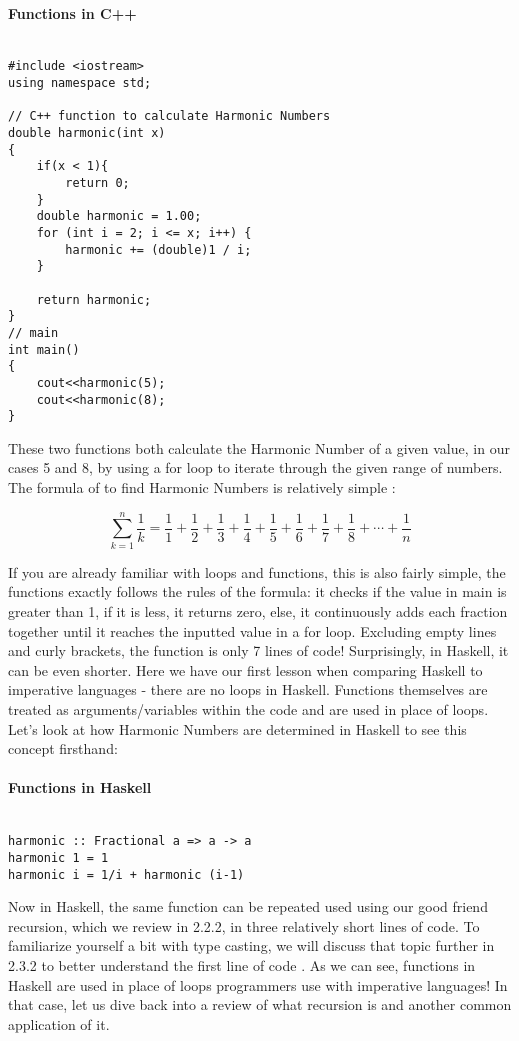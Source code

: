 \documentclass{article}
\begin{document}
\paragraph{Functions in C++}
\begin{lstlisting}

#include <iostream>
using namespace std;
 
// C++ function to calculate Harmonic Numbers
double harmonic(int x)
{
    if(x < 1){
        return 0;
    }
    double harmonic = 1.00;
    for (int i = 2; i <= x; i++) {
        harmonic += (double)1 / i;
    }
 
    return harmonic;
}
// main
int main()
{
    cout<<harmonic(5);
    cout<<harmonic(8);
}
\end{lstlisting}
\noindent
These two functions both calculate the Harmonic Number of a given value, in our cases 5 and 8, by using a for loop to iterate through the given range of numbers. The formula of to find Harmonic Numbers is relatively simple \cite{Harmonic Numbers}:

\[ \sum_{k=1}^{n}\frac{1}{k}  = \frac{1}{1} + \frac{1}{2} + \frac{1}{3} + \frac{1}{4} + \frac{1}{5} + \frac{1}{6} + \frac{1}{7} + \frac{1}{8} + \cdots + \frac{1}{n} \]

\noindent
If you are already familiar with loops and functions, this is also fairly simple, the functions exactly follows the rules of the formula: it checks if the value in main is greater than 1, if it is less, it returns zero, else, it continuously adds each fraction together until it reaches the inputted value in a for loop. Excluding empty lines and curly brackets, the function is only 7 lines of code! Surprisingly, in Haskell, it can be even shorter. Here we have our first lesson when comparing Haskell to imperative languages - there are no loops in Haskell. Functions themselves are treated as arguments/variables within the code and are used in place of loops. Let's look at how Harmonic Numbers are determined in Haskell to see this concept firsthand: 

\paragraph{Functions in Haskell}
\begin{lstlisting}

harmonic :: Fractional a => a -> a 
harmonic 1 = 1 
harmonic i = 1/i + harmonic (i-1)
\end{lstlisting}

\noindent
Now in Haskell, the same function can be repeated used using our good friend recursion, which we review in 2.2.2, in three relatively short lines of code. To familiarize yourself a bit with type casting, we will discuss that topic further in 2.3.2 to better understand the first line of code \cite{Haskell.org Fractional}. As we can see, functions in Haskell are used in place of loops programmers use with imperative languages! In that case, let us dive back into a review of what recursion is and another common application of it.
\end{document}

